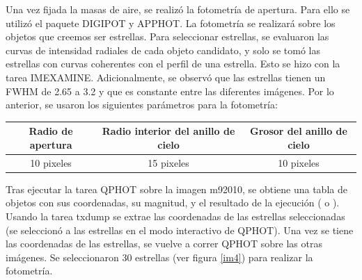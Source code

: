 \documentclass[12pt]{article}
\begin{document}
Una vez fijada la masas de aire, se realizó la fotometría de apertura.
Para ello se utilizó el paquete DIGIPOT y APPHOT.
La fotometría se realizará sobre los objetos que creemos ser estrellas. Para seleccionar estrellas, se evaluaron las curvas de intensidad radiales de cada objeto candidato, y solo se tomó las estrellas con curvas coherentes con el perfil de una estrella.
Esto se hizo con la tarea IMEXAMINE.
Adicionalmente, se observó que las estrellas tienen un FWHM de 2.65 a 3.2 y que es constante entre las diferentes imágenes.
Por lo anterior, se usaron los siguientes parámetros para la fotometría:

\begin{table}[htb]
	\begin{tabular}{|c|c|c| }
	\hline
	Radio de apertura & Radio interior del anillo de cielo & Grosor del anillo de cielo  \\ \hline
	
		10 pixeles & 15 pixeles & 10 pixeles \\
	\hline
	\end{tabular}
\end{table}

Tras ejecutar la tarea QPHOT sobre la imagen m92010, se obtiene una tabla de objetos con sus coordenadas, su magnitud, y el resultado de la ejecución ( o ). Usando la tarea txdump se extrae las coordenadas de las estrellas seleccionadas (se seleccionó a las estrellas en el modo interactivo de QPHOT). Una vez se tiene las coordenadas de las estrellas, se vuelve a correr QPHOT sobre las otras imágenes. Se seleccionaron 30 estrellas (ver figura \ref{im4}) para realizar la fotometría.
\end{document}
